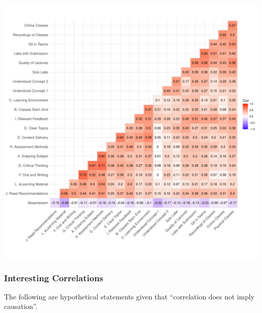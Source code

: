 \documentclass[
]{article}
\begin{document}
\includegraphics{AnalysisOfCourseEvaluation-Notebook_files/figure-latex/CorrelationMatrixWithFigures-1.pdf}

\subsubsection{Interesting Correlations}\label{interesting-correlations}

The following are hypothetical statements given that ``correlation does
not imply causation''.
\end{document}
